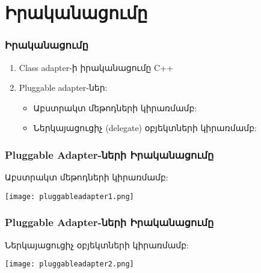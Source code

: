 \documentclass{beamer}
\begin{document}
\section{Իրականացումը}
\begin{frame}\frametitle{Իրականացումը}
\begin{enumerate}
    \item Class adapter-ի իրականացումը C++ \vfill
    \item Pluggable adapter-ներ: \vfill
    \begin{itemize}
        \item Աբստրակտ մեթոդների կիրառմամբ: \vfill
        \item Ներկայացուցիչ (delegate) օբյեկտների կիրառմամբ:
    \end{itemize}
\end{enumerate}
\end{frame}

\begin{frame}\frametitle{Pluggable Adapter-ների Իրականացումը}
Աբստրակտ մեթոդների կիրառմամբ: \vfill
\begin{center}
    \texttt{[image: pluggableadapter1.png]}
\end{center}
\end{frame}

\begin{frame}\frametitle{Pluggable Adapter-ների Իրականացումը}
Ներկայացուցիչ օբյեկտների կիրառմամբ: \vfill
\begin{center}
    \texttt{[image: pluggableadapter2.png]}
\end{center}
\end{frame}
\end{document}

